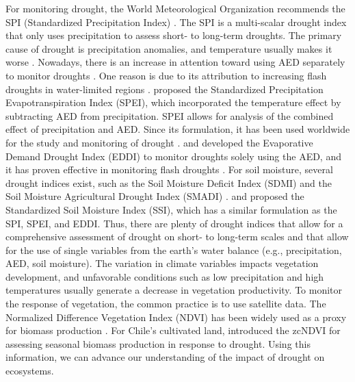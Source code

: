 \documentclass[
  authoryear,
  preprint,
  3p,
  onecolumn]{elsarticle}
\begin{document}
For monitoring drought, the World Meteorological Organization recommends
the SPI (Standardized Precipitation Index) \citep{WMO2012}. The SPI is a
multi-scalar drought index that only uses precipitation to assess short-
to long-term droughts. The primary cause of drought is precipitation
anomalies, and temperature usually makes it worse \citep{Luo2017}.
Nowadays, there is an increase in attention toward using AED separately
to monitor droughts \citep{Vicente-Serrano2020}. One reason is due to
its attribution to increasing flash droughts in water-limited regions
\citep{Noguera2022}. \citet{Vicente-Serrano2010} proposed the
Standardized Precipitation Evapotranspiration Index (SPEI), which
incorporated the temperature effect by subtracting AED from
precipitation. SPEI allows for analysis of the combined effect of
precipitation and AED. Since its formulation, it has been used worldwide
for the study and monitoring of drought
\citep{Gebrechorkos2023, Liu2021}. \citet{Hobbins2016} and
\citet{McEvoy2016} developed the Evaporative Demand Drought Index (EDDI)
to monitor droughts solely using the AED, and it has proven effective in
monitoring flash droughts \citep{Li2024, Ford2023}. For soil moisture,
several drought indices exist, such as the Soil Moisture Deficit Index
(SDMI) \citep{Narasimhan2005} and the Soil Moisture Agricultural Drought
Index (SMADI) \citep{Souza2021}. \citet{Hao2013} and
\citet{AghaKouchak2014} proposed the Standardized Soil Moisture Index
(SSI), which has a similar formulation as the SPI, SPEI, and EDDI. Thus,
there are plenty of drought indices that allow for a comprehensive
assessment of drought on short- to long-term scales and that allow for
the use of single variables from the earth's water balance (e.g.,
precipitation, AED, soil moisture). The variation in climate variables
impacts vegetation development, and unfavorable conditions such as low
precipitation and high temperatures usually generate a decrease in
vegetation productivity. To monitor the response of vegetation, the
common practice is to use satellite data. The Normalized Difference
Vegetation Index (NDVI) has been widely used as a proxy for biomass
production \citep{Camps-Valls2021, Paruelo2016, Helman2014}. For Chile's
cultivated land, \citet{Zambrano2018} introduced the zcNDVI for
assessing seasonal biomass production in response to drought. Using this
information, we can advance our understanding of the impact of drought
on ecosystems.
\end{document}
